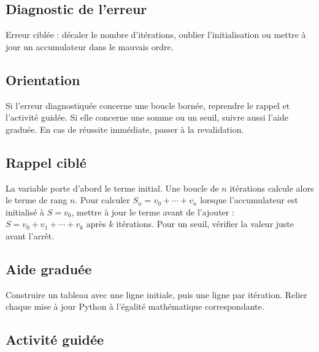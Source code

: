 

\subsection*{Diagnostic de l'erreur}
Erreur ciblée : décaler le nombre d'itérations, oublier l'initialisation ou
mettre à jour un accumulateur dans le mauvais ordre.

\subsection*{Orientation}
Si l'erreur diagnostiquée concerne une boucle bornée, reprendre le rappel et
l'activité guidée. Si elle concerne une somme ou un seuil, suivre aussi
l'aide graduée. En cas de réussite immédiate, passer à la revalidation.

\subsection*{Rappel ciblé}
La variable porte d'abord le terme initial. Une boucle de $n$ itérations
calcule alors le terme de rang $n$. Pour calculer $S_n=v_0+\cdots+v_n$
lorsque l'accumulateur est initialisé à $S=v_0$, mettre à jour le terme avant
de l'ajouter : $S=v_0+v_1+\cdots+v_k$ après $k$ itérations. Pour un seuil,
vérifier la valeur juste avant l'arrêt.

\subsection*{Aide graduée}
Construire un tableau avec une ligne initiale, puis une ligne par itération.
Relier chaque mise à jour Python à l'égalité mathématique correspondante.

\subsection*{Activité guidée}

